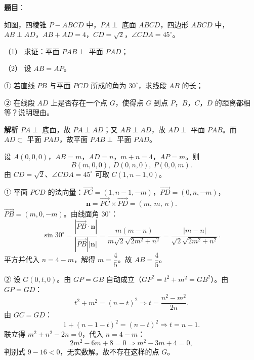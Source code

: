 \begin{answer}

\textbf{题目}：

如图，四棱锥 $P-ABCD$ 中，$PA\perp$ 底面 $ABCD$，四边形 $ABCD$ 中，$AB\perp AD$，$AB+AD=4$，$CD=\sqrt2$，$\angle CDA=45^\circ$。

（1） 求证：平面 $PAB\perp$ 平面 $PAD$；

（2） 设 $AB=AP$。

① 若直线 $PB$ 与平面 $PCD$ 所成的角为 $30^\circ$，求线段 $AB$ 的长；

② 在线段 $AD$ 上是否存在一个点 $G$，使得点 $G$ 到点 $P$，$B$，$C$，$D$ 的距离都相等？说明理由。
\nopagebreak[4]
\begin{center}\end{center}
\nopagebreak[4]
\textbf{解析}
$PA\perp$ 底面，故 $PA\perp AD$；又 $AB\perp AD$，故 $AD\perp$ 平面 $PAB$。而 $AD\subset$ 平面 $PAD$，故平面 $PAB\perp$ 平面 $PAD$。

设 $A(0,0,0)$，$AB=m$，$AD=n$，$m+n=4$，$AP=m$。则
\nopagebreak[4]
\[B(m,0,0),\ D(0,n,0),\ P(0,0,m).\]
由 $CD=\sqrt2$、$\angle CDA=45^\circ$ 可取 $C(1,n-1,0)$。

① 平面 $PCD$ 的法向量：$\overrightarrow{PC}=(1,n-1,-m)$，$\overrightarrow{PD}=(0,n,-m)$，
\nopagebreak[4]
\[\boldsymbol n=\overrightarrow{PC}\times\overrightarrow{PD}=(m,\,m,\,n).\]
$\overrightarrow{PB}=(m,0,-m)$。由线面角 $30^\circ$：
\nopagebreak[4]
\[\sin30^\circ=\frac{|\overrightarrow{PB}\cdot\boldsymbol n|}{|\overrightarrow{PB}||\boldsymbol n|}
=\frac{m(m-n)}{m\sqrt2\sqrt{2m^2+n^2}}=\frac{|m-n|}{\sqrt2\sqrt{2m^2+n^2}}.\]
平方并代入 $n=4-m$，解得 $m=\dfrac45$。故 $AB=\dfrac45$。

② 设 $G(0,t,0)$。由 $GP=GB$ 自动成立（$GP^2=t^2+m^2=GB^2$）。由 $GP=GD$：
\nopagebreak[4]
\[t^2+m^2=(n-t)^2\Longrightarrow t=\frac{n^2-m^2}{2n}.\]
由 $GC=GD$：
\nopagebreak[4]
\[1+(n-1-t)^2=(n-t)^2\Longrightarrow t=n-1.\]
联立得 $m^2+n^2-2n=0$，代入 $n=4-m$：
\nopagebreak[4]
\[2m^2-6m+8=0\Longrightarrow m^2-3m+4=0,\]
判别式 $9-16<0$，无实数解。故不存在这样的点 $G$。



\end{answer}
